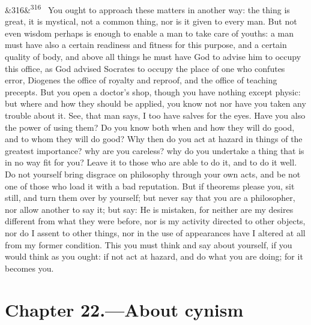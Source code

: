 \documentclass[12pt]{article}
\newcommand{\para}[1][]{\par\noindent\ifx&#1&\else\textsuperscript{\footnotesize #1}~\fi}
\begin{document}
\para[316] You ought to approach these matters in another way: the thing is great, it is mystical, not a common thing, nor is it given to every man. But not even wisdom perhaps is enough to enable a man to take care of youths: a man must have also a certain readiness and fitness for this purpose, and a certain quality of body, and above all things he must have God to advise him to occupy this office, as God advised Socrates to occupy the place of one who confutes error, Diogenes the office of royalty and reproof, and the office of teaching precepts. But you open a doctor's shop, though you have nothing except physic: but where and how they should be applied, you know not nor have you taken any trouble about it. See, that man says, I too have salves for the eyes. Have you also the power of using them? Do you know both when and how they will do good, and to whom they will do good? Why then do you act at hazard in things of the greatest importance? why are you careless? why do you undertake a thing that is in no way fit for you? Leave it to those who are able to do it, and to do it well. Do not yourself bring disgrace on philosophy through your own acts, and be not one of those who load it with a bad reputation. But if theorems please you, sit still, and turn them over by yourself; but never say that you are a philosopher, nor allow another to say it; but say: He is mistaken, for neither are my desires different from what they were before, nor is my activity directed to other objects, nor do I assent to other things, nor in the use of appearances have I altered at all from my former condition. This you must think and say about yourself, if you would think as you ought: if not act at hazard, and do what you are doing; for it becomes you.

\section*{Chapter 22.---About cynism}
\end{document}
